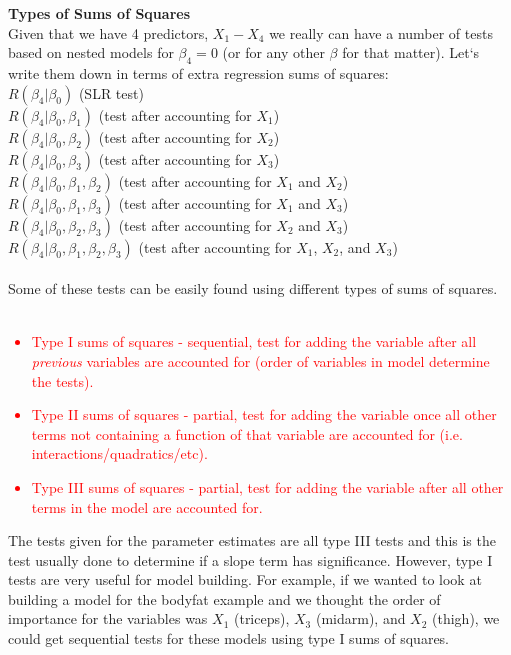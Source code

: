 \documentclass{article}
\begin{document}
\textbf{Types of Sums of Squares}\\
Given that we have 4 predictors, $X_1-X_4$ we really can have a number of tests based on nested models for $\beta_4=0$ (or for any other $\beta$ for that matter).  Let`s write them down in terms of extra regression sums of squares:\\
$R(\beta_4|\beta_0)$ (SLR test)\\
$R(\beta_4|\beta_0,\beta_1)$ (test after accounting for $X_1$)\\
$R(\beta_4|\beta_0,\beta_2)$ (test after accounting for $X_2$)\\
$R(\beta_4|\beta_0,\beta_3)$ (test after accounting for $X_3$)\\
$R(\beta_4|\beta_0,\beta_1,\beta_2)$ (test after accounting for $X_1$ and $X_2$)\\
$R(\beta_4|\beta_0,\beta_1,\beta_3)$ (test after accounting for $X_1$ and $X_3$)\\
$R(\beta_4|\beta_0,\beta_2,\beta_3)$ (test after accounting for $X_2$ and $X_3$)\\
$R(\beta_4|\beta_0,\beta_1,\beta_2,\beta_3)$ (test after accounting for $X_1$, $X_2$, and $X_3$)\\~\\
Some of these tests can be easily found using different types of sums of squares.\\~\\

\textcolor{red}{
\begin{itemize}
\item Type I sums of squares - sequential, test for adding the variable after all \textit{previous} variables are accounted for (order of variables in model determine the tests).
\item Type II sums of squares - partial, test for adding the variable once all other terms not containing a function of that variable are accounted for (i.e. interactions/quadratics/etc).
\item Type III sums of squares - partial, test for adding the variable after all other terms in the model are accounted for.
\end{itemize}
}

The tests given for the parameter estimates are all type III tests and this is the test usually done to determine if a slope term has significance.  However, type I tests are very useful for model building.  For example, if we wanted to look at building a model for the bodyfat example and we thought the order of importance for the variables was $X_1$ (triceps), $X_3$ (midarm), and $X_2$ (thigh), we could get sequential tests for these models using type I sums of squares.\\~\\ 
\end{document}
